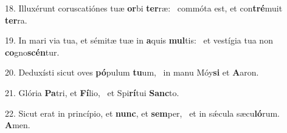 18. Illuxérunt coruscatiónes tuæ \textbf{or}bi \textbf{ter}ræ: \ast\  commóta est, et con\textbf{tré}muit \textbf{ter}ra.\

19. In mari via tua, et sémitæ tuæ in \textbf{a}quis \textbf{mul}tis: \ast\  et vestígia tua non \textbf{co}gno\textbf{scén}tur.\

20. Deduxísti sicut oves \textbf{pó}pulum \textbf{tu}um, \ast\  in manu Móy\textbf{si} et \textbf{A}aron.\

21. Glória \textbf{Pa}tri, et \textbf{Fí}lio, \ast\  et Spi\textbf{rí}tui \textbf{Sanc}to.\

22. Sicut erat in princípio, et \textbf{nunc}, et \textbf{sem}per, \ast\  et in sǽcula sæcu\textbf{ló}rum. \textbf{A}men.\

